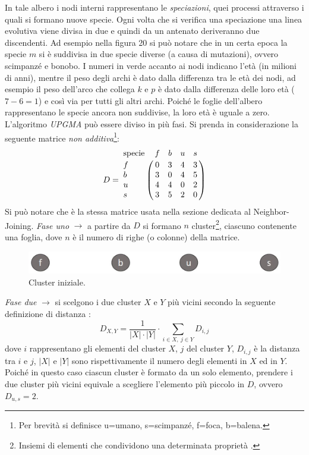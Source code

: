 \newline
In tale albero i nodi interni rappresentano le \textit{speciazioni}, quei processi attraverso i quali si formano nuove specie. Ogni volta che si verifica una speciazione una linea evolutiva viene divisa in due \cite{speciationBritannica} e quindi da un antenato deriveranno due discendenti. Ad esempio nella figura 20 si può notare che in un certa epoca la specie $m$ si è suddivisa in due specie diverse (a causa di mutazioni), ovvero scimpanzé e bonobo. I numeri in verde accanto ai nodi indicano l'età (in milioni di anni), mentre il peso degli archi è dato dalla differenza tra le età dei nodi, ad esempio il peso dell'arco che collega $k$ e $p$ è dato dalla differenza delle loro età ($7-6=1$) e così via per tutti gli altri archi. Poiché le foglie dell'albero rappresentano le specie ancora non suddivise, la loro età è uguale a zero.
\newline
L'algoritmo \textit{UPGMA} può essere diviso in più fasi. Si prenda in considerazione la seguente matrice \textit{non additiva}\footnote{Per brevità si definisce u=umano, s=scimpanzé, f=foca, b=balena.}:
\[
D = \bordermatrix{\text{specie}&f&b&u&s\cr
                f& 0 & 3 & 4 & 3\cr
                b& 3 & 0 & 4 & 5\cr
                u& 4 & 4 & 0 & 2\cr
                s& 3 & 5 & 2 & 0}
\]
Si può notare che è la stessa matrice usata nella sezione dedicata al Neighbor-Joining.
\newline
\textit{Fase uno} $\rightarrow$ a partire da $D$ si formano $n$ cluster\footnote{Insiemi di elementi che condividono una determinata proprietà \cite{cambdrigeClusterDef}.}, ciascuno contenente una foglia, dove $n$ è il numero di righe (o colonne) della matrice.
\begin{figure}[h!]
\centering
	\includegraphics[height=1cm, width=12cm, keepaspectratio]{rooted_upgma_2.jpg}
 	\caption{Cluster iniziale.}
  	\label{fig:rooted_upgma_2}
\end{figure}
\newline
\textit{Fase due} $\rightarrow$ si scelgono i due cluster $X$ e $Y$ più vicini secondo la seguente definizione di distanza \cite{understandingBioinf}:
\[
D_{X,Y}=\frac{1}{\left | X \right |\cdot \left | Y \right |} \cdot \sum_{i\in X,\: j\in Y}D_{i,j}
\]
dove $i$ rappresentano gli elementi del cluster $X$, $j$ del cluster $Y$, $D_{i,j}$ è la distanza tra $i$ e $j$, $ \left | X \right | $ e $ \left | Y \right | $ sono rispettivamente il numero degli elementi in $X$ ed in $Y$. Poiché in questo caso  ciascun cluster è formato da un solo elemento, prendere i due cluster più vicini equivale a scegliere l'elemento più piccolo in $D$, ovvero $D_{u,s}=2$.
